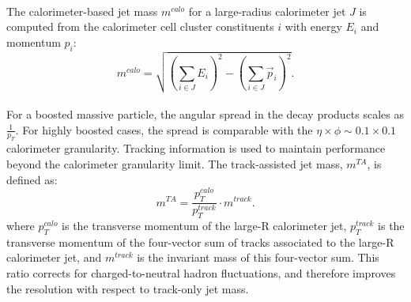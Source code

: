 \paragraph{}
The calorimeter-based jet mass $m^{calo}$ for  a large-radius calorimeter jet $J$ is computed from the calorimeter cell cluster constituents $i$ with energy $E_i$ and momentum $p_i$:
\begin{equation}
m^{calo} = \sqrt{\left(\sum_{i\in J}E_i\right)^2-\left(\sum_{i\in J}\vec{p}_i\right)^2}.
\end{equation}

\paragraph{}
For a boosted massive particle, the angular spread in the decay products scales as $\frac{1}{p_T}$. 
For highly boosted cases, the spread is comparable with the $\eta\times\phi \sim 0.1\times0.1$ calorimeter granularity. 
Tracking information is used to maintain performance beyond the calorimeter granularity limit.
The track-assisted jet mass, $m^{TA}$, is defined as:
\begin{equation}
m^{TA} = \frac{p_T^{calo}}{p_T^{track}} \cdot m^{track}.
\end{equation}
where $p_{T}^{calo}$ is the transverse momentum of the large-R calorimeter jet, $p_{T}^{track}$ is the transverse momentum of the four-vector sum of tracks associated to the large-R calorimeter jet, and $m^{track}$ is the invariant mass of this four-vector sum. This ratio corrects for charged-to-neutral hadron fluctuations, and therefore improves the resolution with respect to track-only jet mass.

